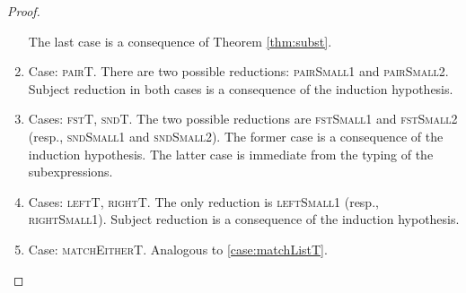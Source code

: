 \documentclass{homework}
\begin{document}
\begin{proof}
\begin{enumerate}
    The last case is a consequence of Theorem \ref{thm:subst}.
  \item Case: \textsc{pairT}.
    There are two possible reductions: \textsc{pairSmall1} and \textsc{pairSmall2}.
    Subject reduction in both cases is a consequence of the induction hypothesis.
  \item Cases: \textsc{fstT}, \textsc{sndT}.
    The two possible reductions are \textsc{fstSmall1} and \textsc{fstSmall2} (resp., \textsc{sndSmall1} and \textsc{sndSmall2}).
    The former case is a consequence of the induction hypothesis.
    The latter case is immediate from the typing of the subexpressions.
  \item Cases: \textsc{leftT}, \textsc{rightT}.
    The only reduction is \textsc{leftSmall1} (resp., \textsc{rightSmall1}).
    Subject reduction is a consequence of the induction hypothesis.
  \item Case: \textsc{matchEitherT}.
    Analogous to \ref{case:matchListT}.
  \end{enumerate}
\end{proof}
\end{document}
